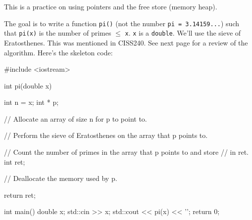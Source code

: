This is a practice on using pointers and the free store (memory heap).

The goal is to
write a function \verb!pi()! (not the number \verb!pi = 3.14159...!)
such that \verb!pi(x)! is the number of primes $\leq$ \verb!x!.
\verb!x! is a \verb!double!.
We'll use the
sieve of Eratosthenes.
This was mentioned in CISS240.
See next page for a review of the algorithm.
Here's the skeleton code:
\begin{console}
#include <iostream>

int pi(double x)
{
    int n = x; 
    int * p;

    // Allocate an array of size n for p to point to.

    // Perform the sieve of Eratosthenes on the array that p points to.

    // Count the number of primes in the array that p points to and store
    // in ret.
    int ret;

    // Deallocate the memory used by p.
    
    return ret;
}

int main()
{
    double x;
    std::cin >> x;
    std::cout << pi(x) << '\n';
    return 0;
}
\end{console}

\begin{comment}
In function \verb!pi()!, other than variable \verb!ret!, all
other variables must be pointers.

(Note: Again, this is a practice on using pointers and the memory heap.
It is actually more natural to use integer variables rather than pointers
in your function.)

The following skeleton code must be used.
Do not modify \verb!main()!.

\begin{console}
#include <iostream>

int pi(double x)
{
    int * numprimes;
    // Declare pointers and allocate memory for all of them

    // Compute number of primes <= x and store at integer that
    // numprimes points to.

    int ret = numprimes;
    // Deallocate memory for all pointers declared

    return ret;
}

int main()
{
    double x;
    std::cin >> x;
    std::cout << pi(x) << '\n';
}
\end{console}
\end{comment}

